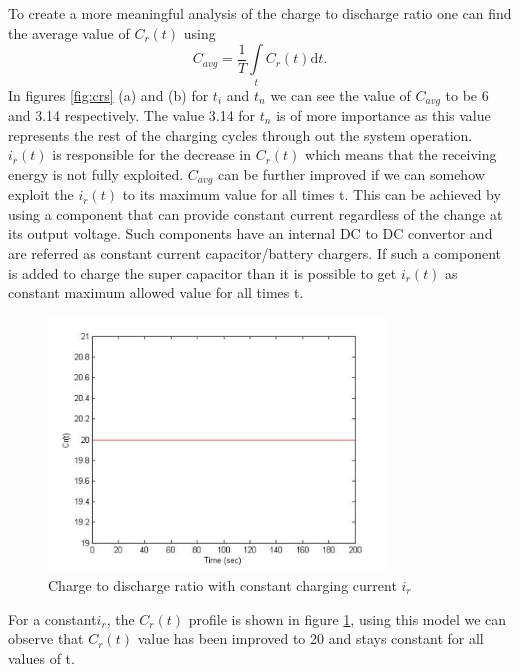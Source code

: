To create a more meaningful analysis of the charge to discharge ratio one can find the average value of $C_r(t)$ using
\begin{equation}\label{eq:cravg}
C_{avg} = \frac{1}{T}\int\limits_t C_r(t) \mathrm{d}t.
\end{equation}
In figures \ref{fig:crs} (a) and (b) for $t_i$ and $t_n$ we can see the value of $ C_{avg}$ to be 6 and 3.14 respectively. The value 3.14 for $t_n$ is of more importance as this value represents the rest of the charging cycles through out the system operation. $i_r(t)$ is responsible for the decrease in $C_r(t)$ which means that the receiving energy is not fully exploited. $C_{avg}$ can be further improved if we can somehow exploit the $i_r(t)$ to its maximum value for all times t. This can be achieved by using a component that can provide constant current regardless of the change at its output voltage. Such components have an internal DC to DC convertor and are referred as constant current capacitor/battery chargers. If such a component is added to charge the super capacitor than it is possible to get $i_r(t)$ as constant maximum allowed value for all times t.

\begin{figure}[h!]
\centering
\includegraphics[width=0.8\textwidth]{ctd2c.pdf}
\caption{Charge to discharge ratio with constant charging current $i_r$}
\label{fig:crconst}
\end{figure}

For a constant$ i_r$, the $C_r(t)$ profile is shown in figure \ref{fig:crconst}, using this model we can observe that $C_r(t)$ value has been improved to 20 and stays constant for all values of t.
